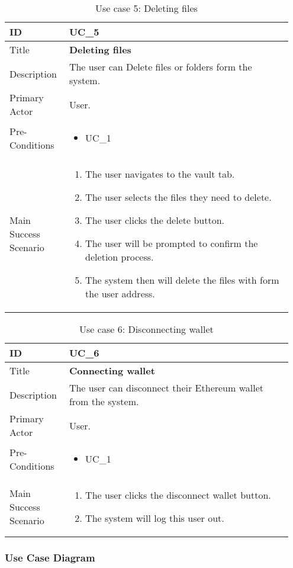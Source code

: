 \begin{longtable}{p{0.20\linewidth} | p{0.75\linewidth}}
  \caption{Use case 5: Deleting files}
  \label{tab:useCaseDelete}
  \\\toprule
  ID & UC\_5
  \\\midrule
  Title & \textbf{Deleting files}
  \\\hline
  Description & The user can Delete files or folders form the system.
  \\\hline
  Primary Actor & User.
  \\\hline
  Pre-Conditions & {
    \begin{itemize}
    \item UC\_1
    \end{itemize}
  }\vspace*{-\baselineskip}
  \\\hline
  Main Success Scenario & {
    \begin{enumerate}
    \item The user navigates to the vault tab.
    \item The user selects the files they need to delete.
    \item The user clicks the delete button.
    \item The user will be prompted to confirm the deletion process.
    \item The system then will delete the files with form the user address.
    \end{enumerate}
  }\vspace*{-\baselineskip}
  \\\bottomrule
\end{longtable}

\begin{longtable}{p{0.20\linewidth} | p{0.75\linewidth}}
  \caption{Use case 6: Disconnecting wallet}
  \label{tab:useCaseDisconnect}
  \\\toprule
  ID & UC\_6
  \\\midrule
  Title & \textbf{Connecting wallet}
  \\\hline
  Description & The user can disconnect their Ethereum wallet from the system.
  \\\hline
  Primary Actor & User.
  \\\hline
  Pre-Conditions & {
    \begin{itemize}
    \item UC\_1
    \end{itemize}
  }\vspace*{-\baselineskip}
  \\\hline
  Main Success Scenario & {
    \begin{enumerate}
    \item The user clicks the disconnect wallet button.
    \item The system will log this user out.
    \end{enumerate}
  }\vspace*{-\baselineskip}
  \\\bottomrule
\end{longtable}

\subsubsection{Use Case Diagram}
